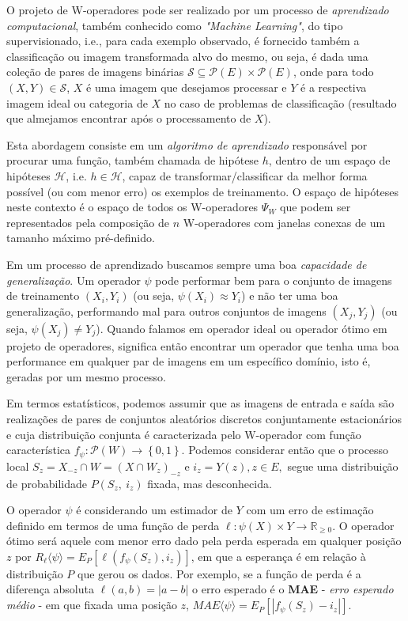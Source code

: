 O projeto de W-operadores pode ser realizado por um processo de \textit{aprendizado computacional}, também conhecido como \textit{"Machine Learning"}, do tipo supervisionado, i.e., para cada exemplo observado, é fornecido também a classificação ou imagem transformada alvo do mesmo, ou seja, é dada uma coleção de pares de imagens binárias $\mathcal{S} \subseteq \mathcal{P} \left(E\right) \times \mathcal{P}\left(E\right)$, onde para todo $ \left( X,Y \right) \in \mathcal{S} $, $X$ é uma imagem que desejamos processar e $Y$ é a respectiva imagem ideal ou categoria de $X$ no caso de problemas de classificação (resultado que almejamos encontrar após o processamento de $X$). 

Esta abordagem consiste em um \textit{algoritmo de aprendizado} responsável por procurar uma função, também chamada de hipótese $h$, dentro de um espaço de hipóteses $\mathcal{H}$, i.e. $h \in \mathcal{H}$, capaz de transformar/classificar da melhor forma possível (ou com menor erro) os exemplos de treinamento. O espaço de hipóteses neste contexto é o espaço de todos os W-operadores $\Psi_{W}$ que podem ser representados pela composição de $n$ W-operadores com janelas conexas de um tamanho máximo pré-definido.

Em um processo de aprendizado buscamos sempre uma boa \textit{capacidade de generalização}. Um operador $\psi$ pode performar bem para o conjunto de imagens de treinamento $\left( X_{i},Y_{i} \right)$ (ou seja, $\psi \left( X_{i} \right) \approx Y_{i}$) e não ter uma boa generalização, performando mal para outros conjuntos de imagens $\left( X_{j},Y_{j} \right)$ (ou seja, $\psi \left( X_{j} \right) \neq Y_{j}$). Quando falamos em operador ideal ou operador ótimo em projeto de operadores, significa então encontrar um operador que tenha uma boa performance em qualquer par de imagens em um específico domínio, isto é, geradas por um mesmo processo.

Em termos estatísticos, podemos assumir que as imagens de entrada e saída são realizações de pares de conjuntos aleatórios discretos conjuntamente estacionários e cuja distribuição conjunta é caracterizada pelo W-operador com função característica $f_{\psi}: \mathcal{P} \left( W \right) \rightarrow \left\{ 0,1 \right\}$. Podemos considerar então que o processo local $S_{z} = X_{-z} \cap W = \left( X \cap W_{z} \right)_{-z} $ e $i_{z} = Y \left( z \right), z \in E, $ segue uma distribuição de probabilidade $P \left( S_{z}, \ i_{z} \right)$ fixada, mas desconhecida.

O operador $\psi$ é considerando um estimador de $Y$ com um erro de estimação definido em termos de uma função de perda $\ell: \psi \left( X \right) \times Y \to \mathbb{R}_{\geq0} $. O operador ótimo será aquele com menor erro dado pela perda esperada em qualquer posição $z$ por $R_{\ell} \langle \psi \rangle =  E_{P} \left[ \ell \left( f_{\psi} \left( S_{z} \right),i_{z} \right) \right]$, em que a esperança é em relação à distribuição $P$ que gerou os dados. Por exemplo, se a função de perda é a diferença absoluta $\ell \left(a,b \right)= \left| a-b \right|$ o erro esperado é o \textbf{MAE} - \textit{erro esperado médio} - em que fixada uma posição $z$, $MAE \langle \psi \rangle =E_{P} \left[ | f_{\psi} \left( S_{z} \right) - i_{z} | \right]$.

